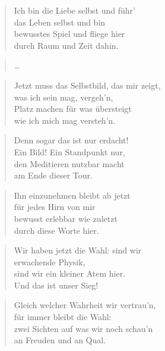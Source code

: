 \documentclass[10pt,a4paper]{article}
\begin{document}
\begin{multicols}{2}
\begin{verse}
Ich bin die Liebe selbst und führ’ \\
das Leben selbst und bin \\
bewusstes Spiel und fliege hier \\
durch Raum und Zeit dahin. \\
\end{verse}

\begin{verse}
…
\end{verse}

\begin{verse}
Jetzt muss das Selbstbild, das mir zeigt, \\
was ich sein mag, vergeh’n, \\
Platz machen für was übersteigt \\
wie ich mich mag versteh’n. \\
\end{verse}

\begin{verse}
Denn sogar das ist nur erdacht! \\
Ein Bild! Ein Standpunkt nur, \\
den Meditieren nutzbar macht \\
am Ende dieser Tour. \\
\end{verse}

\begin{verse}
Ihn einzunehmen bleibt ab jetzt \\
für jedes Hirn von mir \\
bewusst erlebbar wie zuletzt \\
durch diese Worte hier. \\
\end{verse}

\begin{verse}
Wir haben jetzt die Wahl: sind wir \\
erwachende Physik, \\
sind wir ein kleiner Atem hier. \\
Und das ist unser Sieg! \\
\end{verse}

\begin{verse}
Gleich welcher Wahrheit wir vertrau’n, \\
für immer bleibt die Wahl: \\
zwei Sichten auf was wir noch schau’n \\
an Freuden und an Qual. \\
\end{verse}


\end{multicols}
\end{document}
